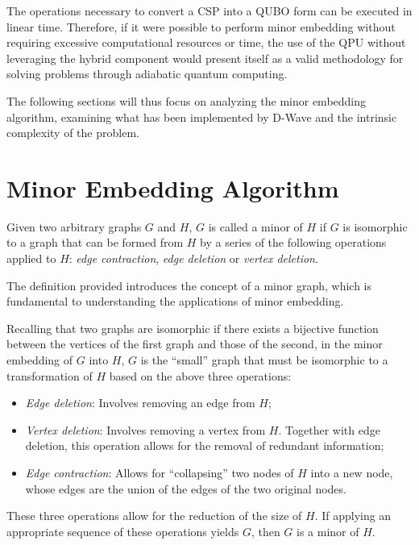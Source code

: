 The operations necessary to convert a CSP into a QUBO form can be executed in linear time. Therefore, if it were possible to perform minor embedding without requiring excessive computational resources or time, the use of the QPU without leveraging the hybrid component would present itself as a valid methodology for solving problems through adiabatic quantum computing.

The following sections will thus focus on analyzing the minor embedding algorithm, examining what has been implemented by D-Wave and the intrinsic complexity of the problem.

\section{Minor Embedding Algorithm}\label{sec:me}

\begin{displayquote}
    Given two arbitrary graphs $G$ and $H$, $G$ is called a minor of $H$ if $G$ is isomorphic to a graph that can be formed from $H$ by a series of the following operations applied to $H$: \emph{edge contraction}, \emph{edge deletion} or \emph{vertex deletion}.
\end{displayquote}

The definition provided introduces the concept of a minor graph, which is fundamental to understanding the applications of minor embedding. 

Recalling that two graphs are isomorphic if there exists a bijective function between the vertices of the first graph and those of the second, in the minor embedding of $G$ into $H$, $G$ is the ``small'' graph that must be isomorphic to a transformation of $H$ based on the above three operations:
\begin{itemize}
    \item \emph{Edge deletion}: Involves removing an edge from $H$;
    \item \emph{Vertex deletion}: Involves removing a vertex from $H$. Together with edge deletion, this operation allows for the removal of redundant information;
    \item \emph{Edge contraction}: Allows for ``collapsing'' two nodes of $H$ into a new node, whose edges are the union of the edges of the two original nodes.
\end{itemize}

These three operations allow for the reduction of the size of $H$. If applying an appropriate sequence of these operations yields $G$, then $G$ is a minor of $H$.

